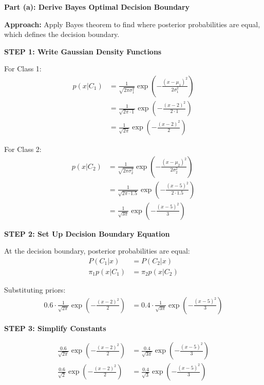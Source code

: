 \documentclass[12pt]{article}
\begin{document}
\begin{solution}

\textbf{Part (a): Derive Bayes Optimal Decision Boundary}

\textbf{Approach:} Apply Bayes theorem to find where posterior probabilities are equal, which defines the decision boundary.

\textbf{STEP 1: Write Gaussian Density Functions}

For Class 1:
\begin{align*}
p(x|C_1) &= \frac{1}{\sqrt{2\pi \sigma_1^2}} \exp\left(-\frac{(x-\mu_1)^2}{2\sigma_1^2}\right) \\
&= \frac{1}{\sqrt{2\pi \cdot 1}} \exp\left(-\frac{(x-2)^2}{2 \cdot 1}\right) \\
&= \frac{1}{\sqrt{2\pi}} \exp\left(-\frac{(x-2)^2}{2}\right)
\end{align*}

For Class 2:
\begin{align*}
p(x|C_2) &= \frac{1}{\sqrt{2\pi \sigma_2^2}} \exp\left(-\frac{(x-\mu_2)^2}{2\sigma_2^2}\right) \\
&= \frac{1}{\sqrt{2\pi \cdot 1.5}} \exp\left(-\frac{(x-5)^2}{2 \cdot 1.5}\right) \\
&= \frac{1}{\sqrt{3\pi}} \exp\left(-\frac{(x-5)^2}{3}\right)
\end{align*}

\textbf{STEP 2: Set Up Decision Boundary Equation}

At the decision boundary, posterior probabilities are equal:
\begin{align*}
P(C_1|x) &= P(C_2|x) \\
\pi_1 p(x|C_1) &= \pi_2 p(x|C_2)
\end{align*}

Substituting priors:
\begin{align*}
0.6 \cdot \frac{1}{\sqrt{2\pi}} \exp\left(-\frac{(x-2)^2}{2}\right) &= 0.4 \cdot \frac{1}{\sqrt{3\pi}} \exp\left(-\frac{(x-5)^2}{3}\right)
\end{align*}

\textbf{STEP 3: Simplify Constants}

\begin{align*}
\frac{0.6}{\sqrt{2\pi}} \exp\left(-\frac{(x-2)^2}{2}\right) &= \frac{0.4}{\sqrt{3\pi}} \exp\left(-\frac{(x-5)^2}{3}\right) \\
\frac{0.6}{\sqrt{2}} \exp\left(-\frac{(x-2)^2}{2}\right) &= \frac{0.4}{\sqrt{3}} \exp\left(-\frac{(x-5)^2}{3}\right)
\end{align*}


\end{solution}
\end{document}
